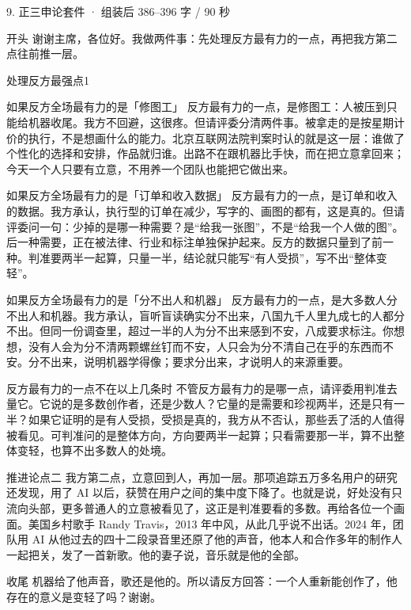 \documentclass[script,pro]{debate}
\begin{document}
\begin{kit}{9. 正三申论}{套件 · 组装后 386–396 字 / 90 秒}
\begin{fixed}{开头}
谢谢主席，各位好。我做两件事：先处理反方最有力的一点，再把我方第二点往前推一层。
\end{fixed}
\begin{pick}{处理反方最强点}{1}
\begin{module}{如果反方全场最有力的是「修图工」}
反方最有力的一点，是修图工：人被压到只能给机器收尾。我方不回避，这很疼。但请评委分清两件事。被拿走的是按星期计价的执行，不是想画什么的能力。北京互联网法院判案时认的就是这一层：谁做了个性化的选择和安排，作品就归谁。出路不在跟机器比手快，而在把立意拿回来；今天一个人只要有立意，不用养一个团队也能把它做出来。
\end{module}
\begin{module}{如果反方全场最有力的是「订单和收入数据」}
反方最有力的一点，是订单和收入的数据。我方承认，执行型的订单在减少，写字的、画图的都有，这是真的。但请评委问一句：少掉的是哪一种需要？是“给我一张图”，不是“给我一个人做的图”。后一种需要，正在被法律、行业和标注单独保护起来。反方的数据只量到了前一种。判准要两半一起算，只量一半，结论就只能写“有人受损”，写不出“整体变轻”。
\end{module}
\begin{module}{如果反方全场最有力的是「分不出人和机器」}
反方最有力的一点，是大多数人分不出人和机器。我方承认，盲听盲读确实分不出来，八国九千人里九成七的人都分不出。但同一份调查里，超过一半的人为分不出来感到不安，八成要求标注。你想想，没有人会为分不清两颗螺丝钉而不安，人只会为分不清自己在乎的东西而不安。分不出来，说明机器学得像；要求分出来，才说明人的来源重要。
\end{module}
\begin{fallback}{反方最有力的一点不在以上几条时}
不管反方最有力的是哪一点，请评委用判准去量它。它说的是多数创作者，还是少数人？它量的是需要和珍视两半，还是只有一半？如果它证明的是有人受损，受损是真的，我方从不否认，那些丢了活的人值得被看见。可判准问的是整体方向，方向要两半一起算；只看需要那一半，算不出整体变轻，也算不出多数人的处境。
\end{fallback}
\end{pick}
\begin{fixed}{推进论点二}
我方第二点，立意回到人，再加一层。那项追踪五万多名用户的研究还发现，用了 AI 以后，获赞在用户之间的集中度下降了。也就是说，好处没有只流向头部，更多普通人的立意被看见了，这正是判准要看的多数。再给各位一个画面。美国乡村歌手 Randy Travis，2013 年中风，从此几乎说不出话。2024 年，团队用 AI 从他过去的四十二段录音里还原了他的声音，他本人和合作多年的制作人一起把关，发了一首新歌。他的妻子说，音乐就是他的全部。
\end{fixed}
\begin{fixed}{收尾}
机器给了他声音，歌还是他的。所以请反方回答：一个人重新能创作了，他存在的意义是变轻了吗？谢谢。
\end{fixed}
\end{kit}
\end{document}
